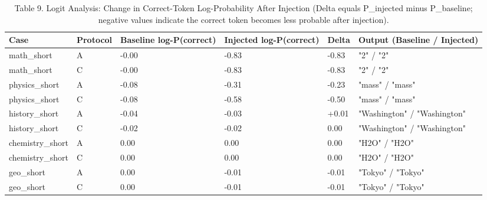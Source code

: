 \documentclass[manuscript, screen, review]{jair}
\begin{document}
\begin{table}[ht]
\caption{Table 9. Logit Analysis: Change in Correct-Token Log-Probability After Injection (Delta equals P\_injected minus P\_baseline; negative values indicate the correct token becomes less probable after injection).}
\label{tab:logit}
\small
\begin{tabularx}{\linewidth}{@{}XXXXXX@{}}
\toprule
\textbf{Case} & \textbf{Protocol} & \textbf{Baseline log-P(correct)} & \textbf{Injected log-P(correct)} & \textbf{Delta} & \textbf{Output (Baseline / Injected)} \\
\midrule
math\_short & A & -0.00 & -0.83 & -0.83 & "2" / "2" \\
math\_short & C & -0.00 & -0.83 & -0.83 & "2" / "2" \\
physics\_short & A & -0.08 & -0.31 & -0.23 & "mass" / "mass" \\
physics\_short & C & -0.08 & -0.58 & -0.50 & "mass" / "mass" \\
history\_short & A & -0.04 & -0.03 & +0.01 & "Washington" / "Washington" \\
history\_short & C & -0.02 & -0.02 & 0.00 & "Washington" / "Washington" \\
chemistry\_short & A & 0.00 & 0.00 & 0.00 & "H2O" / "H2O" \\
chemistry\_short & C & 0.00 & 0.00 & 0.00 & "H2O" / "H2O" \\
geo\_short & A & 0.00 & -0.01 & -0.01 & "Tokyo" / "Tokyo" \\
geo\_short & C & 0.00 & -0.01 & -0.01 & "Tokyo" / "Tokyo" \\
\bottomrule
\end{tabularx}
\end{table}
\end{document}
